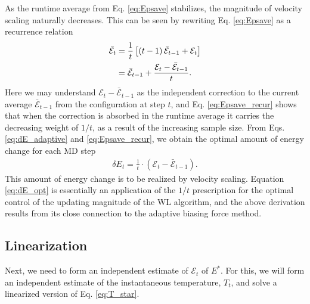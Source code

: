 \documentclass[reprint]{revtex4-1}
\begin{document}
As the runtime average from Eq. \eqref{eq:Epsave}
stabilizes, the magnitude of velocity scaling
naturally decreases.
%
This can be seen by rewriting Eq. \eqref{eq:Epsave}
as a recurrence relation
%
\begin{align}
  \bar{\mathcal E}_t
  &=
  \frac{1}{t}
  \left[
    (t - 1) \, \bar{\mathcal E}_{t - 1}
    + \mathcal E_t
  \right]
  \notag \\
  &=
  \bar{\mathcal E}_{t - 1}
  +
  \frac{
    \mathcal E_t - \bar{\mathcal E}_{t - 1}
  }
  {
    t
  }
  .
\label{eq:Epsave_recur}
\end{align}
%
Here we may understand $\mathcal E_t - \bar{\mathcal E}_{t - 1}$
as the independent correction
to the current average $\bar{\mathcal E}_{t - 1}$
from the configuration at step $t$,
and Eq. \eqref{eq:Epsave_recur} shows that
when the correction is absorbed in the runtime average
it carries the decreasing weight of $1/t$,
as a result of the increasing sample size.
%
From Eqs. \eqref{eq:dE_adaptive} and \eqref{eq:Epsave_recur},
we obtain the optimal amount of energy change
for each MD step
\begin{align}
  \delta E_t
  =
  \frac{ 1 } { t }
  \cdot
  \left( \mathcal E_t - \bar{\mathcal E}_{t - 1} \right)
  .
  \label{eq:dE_opt}
\end{align}
%
This amount of energy change is to be realized by velocity scaling.
%
Equation \eqref{eq:dE_opt} is essentially
an application of
the $1/t$ prescription\cite{
  belardinelli2007, *belardinelli2007jcp, *belardinelli2008,
  zhou2005, *zhou2008, *morozov2007}
for the optimal control of the updating magnitude
of the WL algorithm\cite{wang2001, *wang2001pre},
and the above derivation results from its close connection\cite{
  marsili2006, barducci2008}
to the adaptive biasing force method\cite{darve2001, *darve2008}.
%



\subsection{Linearization}



Next, we need to form an independent estimate of
$\mathcal E_t$ of $E^*$.
%
For this, we will form
an independent estimate of
the instantaneous temperature, $T_t$,
and solve a linearized version of Eq. \eqref{eq:T_star}.
\end{document}
